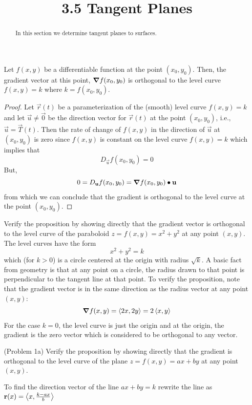 \documentclass[handout]{ximera}
\title{3.5 Tangent Planes}
\begin{document}
\begin{abstract}
In this section we determine tangent planes to surfaces.
\end{abstract}

\maketitle

\begin{proposition}
Let $f(x,y)$ be a differentiable function at the point $(x_0, y_0)$. 
Then, the gradient vector at this point, $\boldsymbol\nabla f(x_0, y_0)$ is orthogonal 
to the level curve $f(x,y) = k$ where $k = f(x_0, y_0)$.
\end{proposition}
\begin{proof}
Let $\vec r(t)$ be a parameterization of the (smooth) level 
curve $f(x,y) = k$ and let $\vec u \neq \vec 0$ be the direction 
vector for $\vec r(t)$ at the point $(x_0, y_0)$, i.e., 
$\vec u = \vec T(t)$. Then the rate of change of $f(x,y)$ in the 
direction of $\vec u$ at $(x_0, y_0)$ is zero since $f(x,y)$ is 
constant on the level curve $f(x,y) = k$ which implies that
\[
D_{\vec u} f(x_0, y_0) = 0
\]
But,
\[
0 = D_{\mathbf u} f(x_0, y_0)  = \boldsymbol\nabla f(x_0, y_0) \bullet \mathbf u
\]
from which we can conclude that the gradient is orthogonal to the level curve 
at the point $(x_0, y_0)$.
\end{proof}


\begin{example}[Example 1]
Verify the proposition by showing directly that the gradient vector is orthogonal 
to the level curve of the paraboloid $z = f(x,y) = x^2 + y^2$ at any point $(x,y)$.\\
The level curves have the form 
\[
x^2 + y^2 = k
\]
which (for $k >0$) is a circle centered at the origin with radius $\sqrt k$. 
A basic fact from geometry is that at any point on a circle, 
the radius drawn to that point is perpendicular to the tangent line at that point.
To verify the proposition, note that the gradient vector is 
in the same direction as the radius vector at any point $(x, y)$:
\[
\boldsymbol\nabla f(x,y) = \left\langle 2x, 2y\right\rangle = 2\left\langle x,y\right\rangle
\]
For the case $k = 0$, the level curve is just the origin and at the origin, 
the gradient is the zero vector 
which is considered to be orthogonal to any vector.
\end{example}

\begin{problem}(Problem 1a)
Verify the proposition by showing directly that the gradient is orthogonal 
to the level curve  of the plane $z = f(x,y) = ax + by$ at any point $(x,y)$.
\begin{hint}
To find the direction vector of the line $ax + by = k$ rewrite 
the line as $\mathbf r(x) = \left\langle x, \frac{k-ax}{b}\right\rangle$
\end{hint}
\end{problem}
\end{document}
